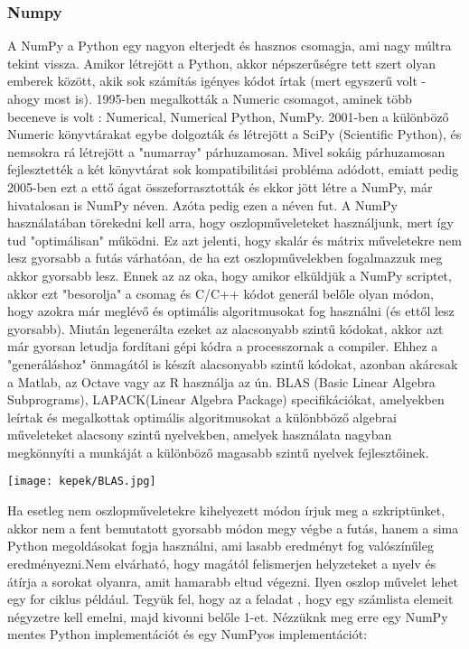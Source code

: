 \documentclass{article}
\theoremstyle{definition}
\theoremstyle{theorem}
\begin{document}
\subsubsection{Numpy}
A NumPy a Python egy nagyon elterjedt és hasznos csomagja, ami nagy múltra tekint vissza. Amikor létrejött a Python, akkor  népszerűségre tett szert olyan emberek között, akik sok számítás igényes kódot írtak (mert egyszerű volt - ahogy most is). 1995-ben megalkották a Numeric csomagot, aminek több beceneve is volt : Numerical, Numerical Python, NumPy. 2001-ben a különböző Numeric könyvtárakat egybe dolgozták és létrejött a SciPy (Scientific Python), és nemsokra rá létrejött a "numarray" párhuzamosan. Mivel sokáig párhuzamosan fejlesztették a két könyvtárat sok kompatibilitási probléma adódott, emiatt pedig 2005-ben ezt a ettő ágat összeforrasztották és ekkor jött létre a NumPy, már hivatalosan is NumPy néven. Azóta pedig ezen a néven fut. A NumPy használatában törekedni kell arra, hogy oszlopműveleteket használjunk, mert így tud "optimálisan" működni. Ez azt jelenti, hogy skalár és mátrix műveletekre nem lesz gyorsabb a futás várhatóan, de ha ezt oszlopművelekben fogalmazzuk meg akkor gyorsabb lesz. Ennek az az oka, hogy amikor elküldjük a NumPy scriptet, akkor ezt "besorolja" a csomag és C/C++ kódot generál belőle olyan módon, hogy azokra már meglévő és optimális algoritmusokat fog használni (és ettől lesz gyorsabb). Miután legenerálta ezeket az alacsonyabb szintű kódokat, akkor azt már gyorsan letudja fordítani gépi kódra a processzornak a compiler. Ehhez a "generáláshoz" önmagától is készít alacsonyabb szintű kódokat, azonban akárcsak a Matlab, az Octave vagy az R használja az ún. BLAS (Basic Linear Algebra Subprograms), LAPACK(Linear Algebra Package) specifikációkat, amelyekben leírtak és megalkottak optimális algoritmusokat a különbböző algebrai műveleteket alacsony szintű nyelvekben, amelyek használata nagyban megkönnyíti a munkáját a különböző magasabb szintű nyelvek fejlesztőinek.
\begin{center}
    \texttt{[image: kepek/BLAS.jpg]}
\end{center}
Ha esetleg nem oszlopműveletekre kihelyezett módon írjuk meg a szkriptünket, akkor nem a fent bemutatott gyorsabb módon megy végbe a futás, hanem a sima Python megoldásokat fogja használni, ami lasabb eredményt fog valószínűleg eredményezni.Nem elvárható, hogy magától felismerjen helyzeteket a nyelv és átírja a sorokat olyanra, amit hamarabb eltud végezni.\newline
Ilyen oszlop művelet lehet egy for ciklus például. Tegyük fel, hogy az a feladat , hogy egy számlista elemeit négyzetre kell emelni, majd kivonni belőle 1-et. Nézzüknk meg erre egy NumPy mentes Python implementációt és egy NumPyos implementációt:
\end{document}
